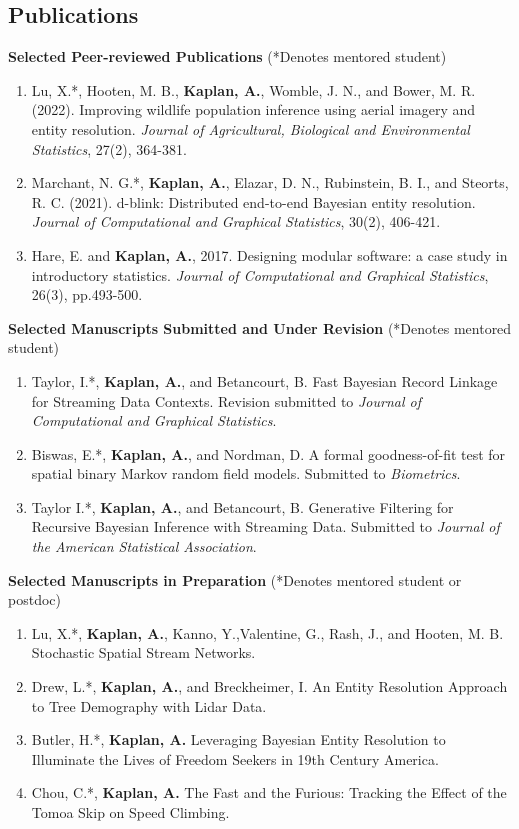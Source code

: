 \documentclass[margin,line]{res}
\begin{document}
\begin{resume}
\section{\sc Publications}


{\bf Selected Peer-reviewed Publications} (*Denotes mentored student) \\
\begin{enumerate}
\item Lu, X.*, Hooten, M. B., {\bf Kaplan, A.}, Womble, J. N., and Bower, M. R. (2022). Improving wildlife population inference using aerial imagery and entity resolution. {\em Journal of Agricultural, Biological and Environmental Statistics}, 27(2), 364-381.
\item Marchant, N. G.*, {\bf Kaplan, A.}, Elazar, D. N., Rubinstein, B. I., and Steorts, R. C. (2021). d-blink: Distributed end-to-end Bayesian entity resolution. {\em Journal of Computational and Graphical Statistics}, 30(2), 406-421.
\item Hare, E. and {\bf Kaplan, A.}, 2017. Designing modular software: a case study in introductory statistics. {\em Journal of Computational and Graphical Statistics}, 26(3), pp.493-500.
\end{enumerate}


{\bf Selected Manuscripts Submitted and Under Revision} (*Denotes mentored student) \\
\begin{enumerate}
\item Taylor, I.*, {\bf Kaplan, A.}, and Betancourt, B. Fast Bayesian Record Linkage for Streaming Data Contexts. Revision submitted to {\em Journal of Computational and Graphical Statistics}.
\item Biswas, E.*, {\bf Kaplan, A.}, and Nordman, D. A formal goodness-of-fit test for spatial binary Markov random field models. Submitted to {\em Biometrics}.
\item Taylor I.*, {\bf Kaplan, A.}, and Betancourt, B. Generative Filtering for Recursive Bayesian Inference with Streaming Data. Submitted to {\em Journal of the American Statistical Association}.
\end{enumerate}

{\bf Selected Manuscripts in Preparation} (*Denotes mentored student or postdoc) \\
\begin{enumerate}
\item Lu, X.*, \mkbibbold{Kaplan, A.}, Kanno, Y.,Valentine, G., Rash, J., and Hooten, M. B. Stochastic Spatial Stream Networks.
\item Drew, L.*, {\bf Kaplan, A.}, and Breckheimer, I. An Entity Resolution Approach to Tree Demography with Lidar Data.
\item Butler, H.*, {\bf Kaplan, A.} Leveraging Bayesian Entity Resolution to Illuminate the Lives of Freedom Seekers in 19th Century America.
\item Chou, C.*, {\bf Kaplan, A.} The Fast and the Furious: Tracking the Effect of the Tomoa Skip on Speed Climbing.
\end{enumerate}









\end{resume}
\end{document}
